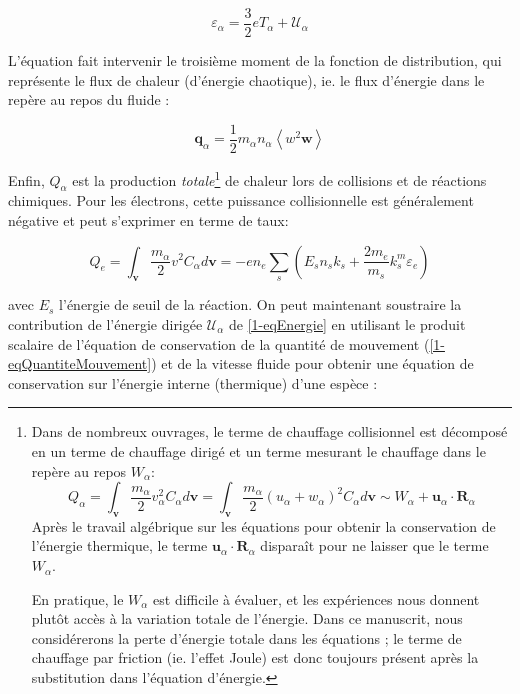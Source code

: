 \begin{refsection}
\begin{equation}
\varepsilon_\alpha=\frac{3}{2}eT_\alpha+\mathcal{U}_\alpha
\end{equation}

 L'équation fait intervenir le
troisième moment de la fonction de distribution, qui représente le flux de chaleur (d'énergie chaotique), ie. le
flux d'énergie dans le repère au repos du fluide :

\begin{equation}
	\mathbf q_\alpha=\frac{1}{2}m_\alpha
	n_\alpha\left<w^2\mathbf w\right>
\end{equation} 

Enfin, ${Q}_\alpha$ est la production \emph{totale}\footnote{Dans de
nombreux ouvrages, le terme de chauffage collisionnel est décomposé en un terme de chauffage dirigé et un terme mesurant
le chauffage dans le repère au repos ${W}_\alpha$:
$${Q}_\alpha=\int_{\mathbf v}\frac{m_\alpha}{2}v_\alpha^2C_\alpha
d\mathbf v=\int_{\mathbf v}\frac{m_\alpha}{2}(u_\alpha+w_\alpha)^2C_\alpha d\mathbf
v\sim{W}_\alpha+\mathbf u_\alpha\cdot\mathbf R_\alpha $$ Après le
travail algébrique sur les équations pour obtenir la conservation de l'énergie
thermique, le terme $\mathbf u_\alpha\cdot\mathbf R_\alpha$ disparaît pour
ne laisser que le terme ${W}_\alpha$. 

En pratique, le
${W}_\alpha$ est difficile à évaluer, et les expériences nous donnent
plutôt accès à la variation totale de l'énergie.
Dans ce manuscrit, nous
considérerons la perte d'énergie totale dans les équations ; le terme de
chauffage par friction (ie.
l'effet Joule) est donc toujours présent après la substitution dans l'équation d'énergie.} de chaleur lors de collisions et de
réactions chimiques.
Pour les électrons, cette puissance collisionnelle est généralement négative et peut s'exprimer en terme de taux:

\begin{equation}
	Q_e=\int_{\mathbf
	v}\frac{m_\alpha}{2}v^2C_\alpha d\mathbf
	v=-en_e\sum_{s}\left(E_sn_sk_s+\frac{2m_e}{m_s}k^m_s\varepsilon_e\right)
\end{equation}

avec $E_s$ l'énergie de seuil de la réaction. On peut maintenant soustraire la
contribution de l'énergie dirigée $\mathcal{U}_{\alpha}$ de \eqref{1-eqEnergie} en utilisant le produit scalaire de l'équation de
conservation de la quantité de mouvement (\eqref{1-eqQuantiteMouvement}) et de
la vitesse fluide pour obtenir une équation de conservation sur l'énergie
interne (thermique) d'une espèce :


\end{refsection}
